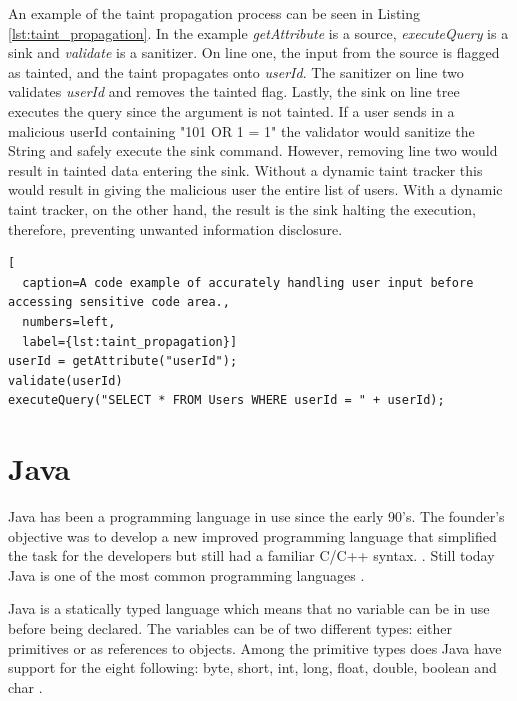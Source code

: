 An example of the taint propagation process can be seen in Listing \ref{lst:taint_propagation}. In the example \textit{getAttribute} is a source, \textit{executeQuery} is a sink and \textit{validate} is a sanitizer. On line one, the input from the source is flagged as tainted, and the taint propagates onto \textit{userId}. The sanitizer on line two validates \textit{userId} and removes the tainted flag. Lastly, the sink on line tree executes the query since the argument is not tainted. If a user sends in a malicious userId containing "101 OR 1 = 1" the validator would sanitize the String and safely execute the sink command. However, removing line two would result in tainted data entering the sink. Without a dynamic taint tracker this would result in giving the malicious user the entire list of users. With a dynamic taint tracker, on the other hand, the result is the sink halting the execution, therefore, preventing unwanted information disclosure.

\hfill
\begin{minipage}[H]{\linewidth}
\begin{lstlisting}[
  caption=A code example of accurately handling user input before accessing sensitive code area.,
  numbers=left,
  label={lst:taint_propagation}]
userId = getAttribute("userId");
validate(userId)
executeQuery("SELECT * FROM Users WHERE userId = " + userId);
\end{lstlisting}
\end{minipage}
\hfill



\section{Java}
\label{JavaInstrumentation}
Java has been a programming language in use since the early 90's. The founder's objective was to develop a new improved programming language that simplified the task for the developers but still had a familiar C/C++ syntax. \parencite{OracleVoice}. Still today Java is one of the most common programming languages \parencite{octoverse}.

Java is a statically typed language which means that no variable can be in use before being declared. The variables can be of two different types: either primitives or as references to objects. Among the primitive types does Java have support for the eight following: byte, short, int, long, float, double, boolean and char \parencite{primjav}.



